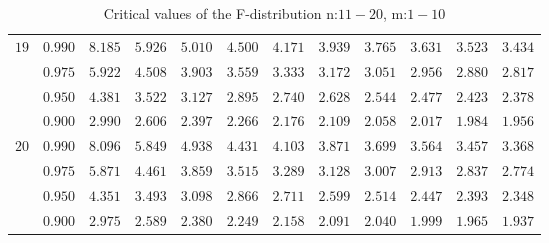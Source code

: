 \documentclass[11pt]{article}
\theoremstyle{definition}
\begin{document}
\begin{table}[H]
\begin{tabularx}{\linewidth}{c | c | c c c c c c c c c c}
		$19$ & $0.990$ & $8.185$ & $5.926$ & $5.010$ & $4.500$ & $4.171$ & $3.939$ & $3.765$ & $3.631$ & $3.523$ & $3.434$ \\
		& $0.975$ & $5.922$ & $4.508$ & $3.903$ & $3.559$ & $3.333$ & $3.172$ & $3.051$ & $2.956$ & $2.880$ & $2.817$ \\
		& $0.950$ & $4.381$ & $3.522$ & $3.127$ & $2.895$ & $2.740$ & $2.628$ & $2.544$ & $2.477$ & $2.423$ & $2.378$ \\
		& $0.900$ & $2.990$ & $2.606$ & $2.397$ & $2.266$ & $2.176$ & $2.109$ & $2.058$ & $2.017$ & $1.984$ & $1.956$ \\
		$20$ & $0.990$ & $8.096$ & $5.849$ & $4.938$ & $4.431$ & $4.103$ & $3.871$ & $3.699$ & $3.564$ & $3.457$ & $3.368$ \\
		& $0.975$ & $5.871$ & $4.461$ & $3.859$ & $3.515$ & $3.289$ & $3.128$ & $3.007$ & $2.913$ & $2.837$ & $2.774$ \\
		& $0.950$ & $4.351$ & $3.493$ & $3.098$ & $2.866$ & $2.711$ & $2.599$ & $2.514$ & $2.447$ & $2.393$ & $2.348$ \\
		& $0.900$ & $2.975$ & $2.589$ & $2.380$ & $2.249$ & $2.158$ & $2.091$ & $2.040$ & $1.999$ & $1.965$ & $1.937$
	\end{tabularx}
	\caption{Critical values of the F-distribution n:$11-20$, m:$1-10$}
\end{table}
\end{document}
